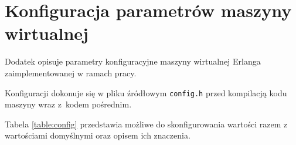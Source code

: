 \chapter{Konfiguracja parametrów maszyny wirtualnej}
\label{cha:config}

Dodatek opisuje parametry konfiguracyjne maszyny wirtualnej Erlanga zaimplementowanej w ramach pracy.

Konfiguracji dokonuje się w pliku źródłowym \texttt{config.h} przed kompilacją kodu maszyny wraz z~kodem pośrednim.

Tabela \ref{table:config} przedstawia możliwe do skonfigurowania wartości razem z wartościami domyślnymi oraz opisem ich znaczenia.

\begin{longtable}{|c|c|p{9cm}|}
\hline


\end{longtable}
